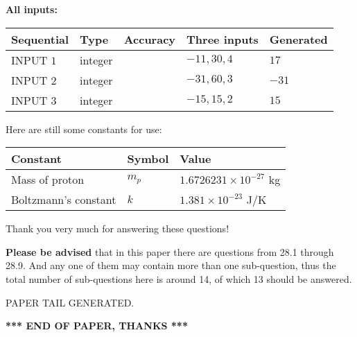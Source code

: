 \documentclass[12pt]{article}
\begin{document}
   
   
   
\noindent\vspace{0.1in}\hspace{-0.08in} {\textbf{\Large{All inputs: }}}
   
   
  
  
\noindent\begin{tabular}{|l|l|l|l|l|}
\hline
 Sequential & Type & Accuracy & Three inputs & Generated \\ 
\hline
 
 
  INPUT $           1$ & integer &  & $
 -11
 , 
 30
 , 
 4
 $ & $ 17 $ 
 \\  \hline  
 
 
  INPUT $           2$ & integer &  & $
 -31
 , 
 60
 , 
 3
 $ & $ -31 $ 
 \\  \hline  
 
 
  INPUT $           3$ & integer &  & $
 -15
 , 
 15
 , 
 2
 $ & $ 15 $ 
 \\  \hline  
 \end{tabular}
   
   
   
   
   
   
 \vspace{0.2in}
Here are still some constants for use:
 
 
\noindent\begin{tabular}{|l|l|l|}
\hline
Constant & Symbol & Value \\
\hline
 
Mass of proton &
$m_p$ &
 $ 1.6726231 \times 10^{-27} $
kg \\
\hline
 
Boltzmann's constant &
$k$ &
 $ 1.381 \times 10^{-23} $
J/K \\
\hline
 
\end{tabular}
 
Thank you very much for answering these questions!
 
{\textbf{\large{Please be advised}}} that in this paper there are questions from
28.1 through
28.9.
And any one of them may contain more than one sub-question, thus the total number
of sub-questions here is around 14, of which
13 should be answered.
 
   
   
\vspace{2.0in} PAPER TAIL GENERATED.
   
   
   
   
\vspace{1.0in} 
{\textbf{\large{ *** END OF PAPER, THANKS *** }}} 
   
\end{document}
